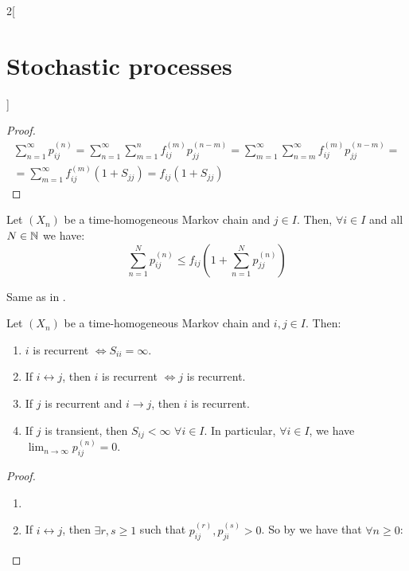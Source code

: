 \documentclass[../../../main_math.tex]{subfiles}
\begin{document}
\begin{multicols}{2}[\section{Stochastic processes}]
\begin{proof}
    \begin{multline*}
      \sum_{n=1}^\infty p_{ij}^{(n)}= \sum_{n=1}^\infty \sum_{m=1}^n f_{ij}^{(m)}p_{jj}^{(n-m)}=\sum_{m=1}^\infty \sum_{n=m}^\infty f_{ij}^{(m)}p_{jj}^{(n-m)}=\\=\sum_{m=1}^\infty f_{ij}^{(m)}(1+S_{jj})=f_{ij}(1+S_{jj})
    \end{multline*}
  \end{proof}
  \begin{lemma}\label{SP:lemaPrerec2}
    Let $(X_n)$ be a time-homogeneous Markov chain and $j\in I$. Then, $\forall i\in I$ and all $N\in\mathbb{N}$ we have:
    $$
      \sum_{n=1}^Np_{ij}^{(n)}\leq f_{ij}\left(1+\sum_{n=1}^Np_{jj}^{(n)}\right)
    $$
  \end{lemma}
  \begin{sproof}
    Same as in .
  \end{sproof}
  \begin{theorem}\label{SP:thmRec}
    Let $(X_n)$ be a time-homogeneous Markov chain and $i,j\in I$. Then:
    \begin{enumerate}
      \item\label{SP:thmRecA} $i$ is recurrent $\iff S_{ii}=\infty$.
      \item\label{SP:thmRecB} If $i\leftrightarrow j$, then $i$ is recurrent $\iff j$ is recurrent.
      \item\label{SP:thmRecC} If $j$ is recurrent and $i\to j$, then $i$ is recurrent.
      \item\label{SP:thmRecD} If $j$ is transient, then $S_{ij}<\infty$ $\forall i\in I$. In particular, $\forall i\in I$, we have $\displaystyle \lim_{n\to\infty}p_{ij}^{(n)}=0$.
    \end{enumerate}
  \end{theorem}
  \begin{proof}
    \begin{enumerate}
      \item {}
      \item If $i\leftrightarrow j$, then $\exists r,s\geq 1$ such that $p_{ij}^{(r)}, p_{ji}^{(s)}>0$. So by  we have that $\forall n\geq 0$:

\end{enumerate}
\end{proof}
\end{multicols}
\end{document}
